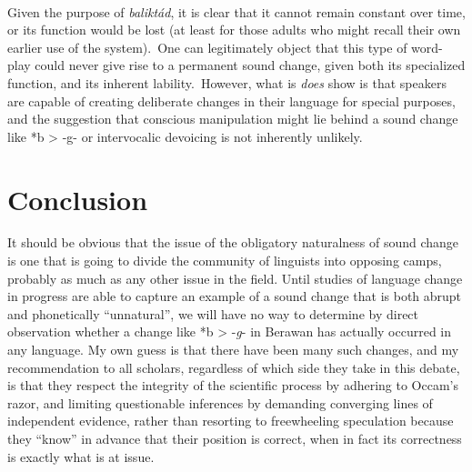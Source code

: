 \documentclass[output=paper]{langscibook}
\begin{document}
~

Given the purpose of \textit{baliktád}, it is clear that it cannot remain constant over time, or its function would be lost (at least for those adults who might recall their own earlier use of the system).~One can legitimately object that this type of word-play could never give rise to a permanent sound change, given both its specialized function, and its inherent lability.~However, what is \textit{does} show is that speakers are capable of creating deliberate changes in their language for special purposes, and the suggestion that conscious manipulation might lie behind a sound change like *b > -g- or intervocalic devoicing is not inherently unlikely.

\section{Conclusion}\label{sec:Conclusion}
It should be obvious that the issue of the obligatory naturalness of sound change is one that is going to divide the community of linguists into opposing camps, probably as much as any other issue in the field. Until studies of language change in progress are able to capture an example of a sound change that is both abrupt and phonetically “unnatural”, we will have no way to determine by direct observation whether a change like *b > -\textit{g}- in Berawan has actually occurred in any language. My own guess is that there have been many such changes, and my recommendation to all scholars, regardless of which side they take in this debate, is that they respect the integrity of the scientific process by adhering to Occam’s razor, and limiting questionable inferences by demanding converging lines of independent evidence, rather than resorting to freewheeling speculation because they “know” in advance that their position is correct, when in fact its correctness is exactly what is at issue.
\end{document}
